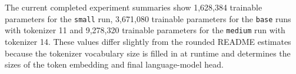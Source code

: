 The current completed experiment summaries show 1,628,384 trainable parameters for the \verb|small| run, 3,671,080 trainable parameters for the \verb|base| runs with tokenizer 11 and 9,278,320 trainable parameters for the \verb|medium| run with tokenizer 14.  These values differ slightly from the rounded README estimates because the tokenizer vocabulary size is filled in at runtime and determines the sizes of the token embedding and final language-model head.
